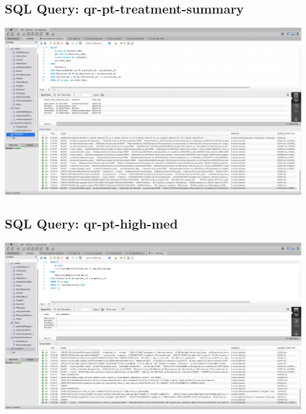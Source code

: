 \documentclass[a4paper,11pt]{article}
\theoremstyle{mytheor}
\begin{document}
\subsection{SQL Query: qr-pt-treatment-summary}
\includegraphics[width=\textwidth]{Screenshots/SCR-20240727-pgzh.png}

\subsection{SQL Query: qr-pt-high-med}
\includegraphics[width=\textwidth]{Screenshots/SCR-20240727-phhm.png}
\end{document}
